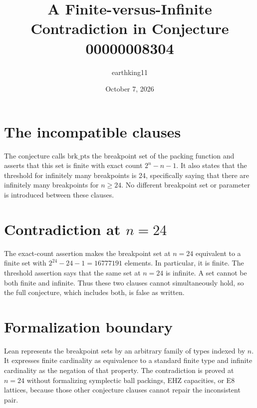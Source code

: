 \documentclass[11pt]{article}
\title{A Finite-versus-Infinite Contradiction in Conjecture 00000008304}
\author{earthking11}
\date{October 7, 2026}
\begin{document}
\maketitle

\section*{The incompatible clauses}
The conjecture calls $\mathrm{brk\_pts}$ the breakpoint set of the packing function and asserts that this set is finite with exact count $2^n-n-1$. It also states that the threshold for infinitely many breakpoints is 24, specifically saying that there are infinitely many breakpoints for $n\ge 24$. No different breakpoint set or parameter is introduced between these clauses.

\section*{Contradiction at $n=24$}
The exact-count assertion makes the breakpoint set at $n=24$ equivalent to a finite set with $2^{24}-24-1=16777191$ elements. In particular, it is finite. The threshold assertion says that the same set at $n=24$ is infinite. A set cannot be both finite and infinite. Thus these two clauses cannot simultaneously hold, so the full conjecture, which includes both, is false as written.

\section*{Formalization boundary}
Lean represents the breakpoint sets by an arbitrary family of types indexed by $n$. It expresses finite cardinality as equivalence to a standard finite type and infinite cardinality as the negation of that property. The contradiction is proved at $n=24$ without formalizing symplectic ball packings, EHZ capacities, or E8 lattices, because those other conjecture clauses cannot repair the inconsistent pair.
\end{document}
